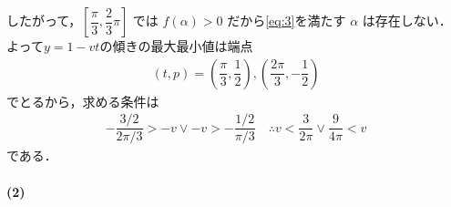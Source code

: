 \documentclass[../../main.tex]{subfiles}
\begin{document}
したがって，$\left[\dfrac{\pi}{3}, \dfrac{2}{3}\pi\right]$ では $f(\alpha) > 0$ だから\cref{eq:3}を満たす $\alpha$ は存在しない．
よって$y=1-vt$の傾きの最大最小値は端点
\begin{align}
  (t,p)=\left(\dfrac{\pi}{3},\dfrac{1}{2}\right), \left(\dfrac{2\pi}{3},-\dfrac{1}{2}\right)
\end{align}
でとるから，求める条件は
\begin{align}
  -\dfrac{3/2}{2\pi/3} > -v \lor -v > -\dfrac{1/2}{\pi/3}
  \quad \therefore
  v < \dfrac{3}{2\pi} \lor \dfrac{9}{4\pi} < v
\end{align}
である．

\paragraph{(2)}
\end{document}
